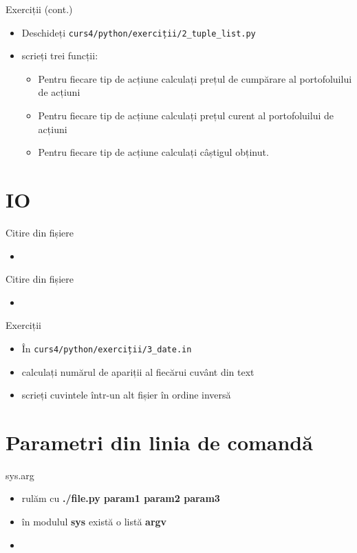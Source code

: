 \documentclass{beamer}
\begin{document}
\begin{frame}{Exerciții (cont.)}
  \begin{itemize}
  \item Deschideți \texttt{curs4/python/exerciții/2\_tuple\_list.py}
  \item scrieți trei funcții:
    \begin {itemize}
    \item Pentru fiecare tip de acțiune calculați prețul de cumpărare al portofoluilui de acțiuni
    \item Pentru fiecare tip de acțiune calculați prețul curent al portofoluilui de acțiuni
    \item Pentru fiecare tip de acțiune calculați câștigul obținut.
    \end{itemize}
  \end{itemize}
\end{frame}


\section{IO}
\frame{\tableofcontents[currentsection]}

\begin{frame}{Citire din fișiere}
  \begin{itemize}
  \item \small 
  \end{itemize}
\end{frame}

\begin{frame}{Citire din fișiere}
  \begin{itemize}
  \item \small 
  \end{itemize}
\end{frame}

\begin{frame}{Exerciții}
  \begin{itemize}
  \item În \texttt{curs4/python/exerciții/3\_date.in}
  \item calculați numărul de apariții al fiecărui cuvânt din text
  \item scrieți cuvintele într-un alt fișier în ordine inversă
  \end{itemize}
\end{frame}


\section{Parametri din linia de comandă}
\frame{\tableofcontents[currentsection]}

\begin{frame}{sys.arg}
  \begin{itemize}
  \item rulăm cu \textbf{./file.py param1 param2 param3}
  \item în modulul \textbf{sys} există o listă \textbf{argv}
  \item \small 
  \end{itemize}
\end{frame}
\end{document}
